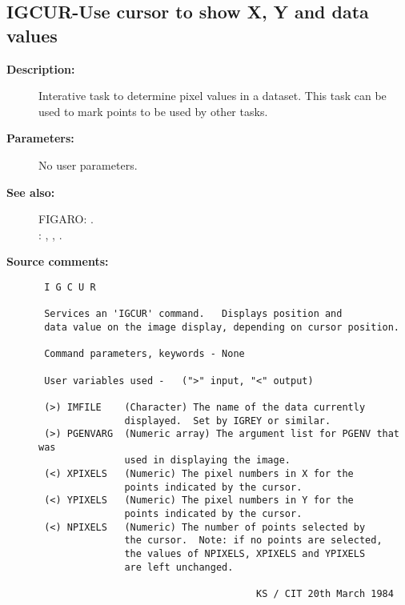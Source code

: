 \subsection{IGCUR-\label{IGCUR}Use cursor to show X, Y and data values}
\begin{description}

\item [{\bf Description:}]
 Interative task to determine pixel values in a dataset.
 This task can be used to mark points to be used by other
 tasks.

\item [{\bf Parameters:}]
 No user parameters.

\item [{\bf See also:}]
FIGARO: . \\
: , , .\\

\item [{\bf Source comments:}]
\begin{verbatim}
 I G C U R

 Services an 'IGCUR' command.   Displays position and
 data value on the image display, depending on cursor position.

 Command parameters, keywords - None

 User variables used -   (">" input, "<" output)

 (>) IMFILE    (Character) The name of the data currently
               displayed.  Set by IGREY or similar.
 (>) PGENVARG  (Numeric array) The argument list for PGENV that was
               used in displaying the image.
 (<) XPIXELS   (Numeric) The pixel numbers in X for the
               points indicated by the cursor.
 (<) YPIXELS   (Numeric) The pixel numbers in Y for the
               points indicated by the cursor.
 (<) NPIXELS   (Numeric) The number of points selected by
               the cursor.  Note: if no points are selected,
               the values of NPIXELS, XPIXELS and YPIXELS
               are left unchanged.

                                      KS / CIT 20th March 1984
\end{verbatim}
\end{description}
